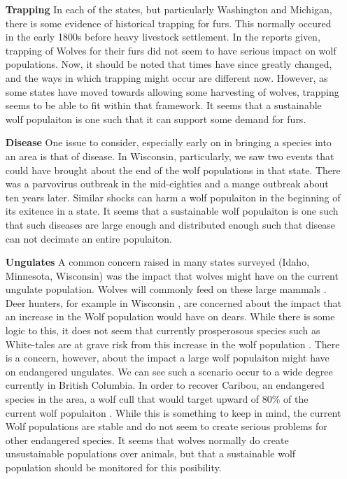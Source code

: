 \documentclass[12pt]{article}
\begin{document}
\begin{enumerate}
\item [\textbf{Trapping}] 
In each of the states, but particularly Washington and Michigan,
there is some evidence of historical trapping for furs.
This normally occured in the early 1800s before heavy livestock settlement.
In the reports given, trapping of Wolves for their furs did not seem to have serious impact on wolf populations.
Now, it should be noted that times have since greatly changed, 
and the ways in which trapping might occur are different now. 
However, as some states have moved towards allowing some harvesting of wolves, 
trapping seems to be able to fit within that framework.
It seems that a sustainable wolf populaiton is one such that it can support some demand for furs.

\item [\textbf{Disease}]
One issue to consider,
especially early on in bringing a species into an area is that of disease. 
In Wisconsin, particularly, we saw two events that could have brought about the end of the wolf populations in that state. 
There was a parvovirus outbreak in the mid-eighties and a mange outbreak about ten years later.
Similar shocks can harm a wolf populaiton in the beginning of its exitence in a state.
It seems that a sustainable wolf populaiton is one such that such diseases are large enough and distributed enough such that 
disease can not decimate an entire populaiton.

\item [\textbf{Ungulates}]
A common concern raised in many states surveyed (Idaho, Minnesota, Wisconsin)
was the impact that wolves might have on the current ungulate population.
Wolves will commonly feed on these large mammals \cite{WikiWolf}.
Deer hunters, for example in Wisconsin \cite{2014OpinionWI},
    are concerned about the impact that an increase in the Wolf population would have on dears.
While there is some logic to this,
    it does not seem that currently prosperosous species such as White-tales are at grave risk from this increase in the wolf population \cite{2018VideoWA}.
There is a concern, 
however, 
about the impact a large wolf populaiton might have on endangered ungulates.
We can see such a scenario occur to a wide degree currently in British Columbia.
In order to recover Caribou, an endangered species in the area, a wolf cull that would target upward of $80\%$ of the current wolf populaiton \cite{BCWolfCull}.
While this is something to keep in mind,
the current Wolf populations are stable and do not seem to create serious problems for other endangered species.
It seems that wolves normally do create unsustainable populations over animals, 
but that a sustainable wolf population should be monitored for this posibility. 


\end{enumerate}
\end{document}
